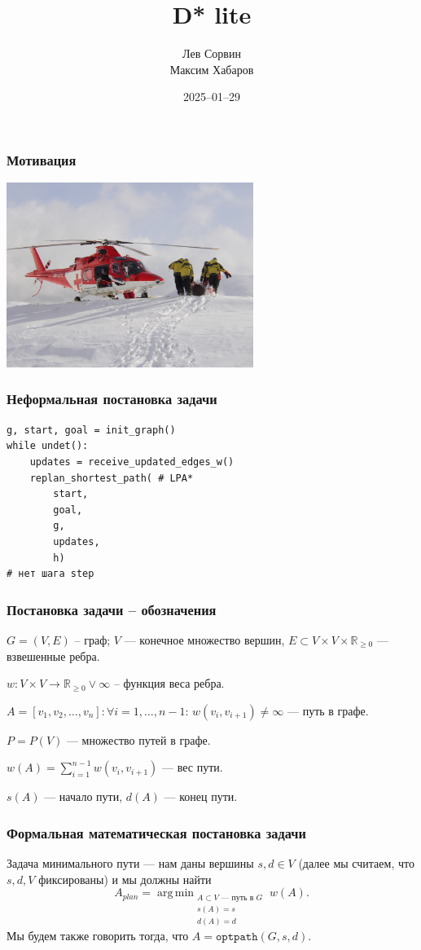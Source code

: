 \documentclass{beamer}
\title{D* lite}
\author{Лев Сорвин \\ Максим Хабаров}
\date{2025--01--29}
\newcommand{\realpositive}{\mathbb{R}_{\geqslant 0}}
\DeclareMathOperator*{\argmin}{arg\,min}
\begin{document}
    \frame{\titlepage}
    \begin{frame}[fragile]
        \frametitle{Мотивация}
        \begin{center}
            \includegraphics[height=6cm]{../figures/medical-evacuation}
        \end{center}
    \end{frame}

    \begin{frame}[fragile]
        \frametitle{Неформальная постановка задачи}
        \begin{verbatim}
g, start, goal = init_graph()
while undet():
    updates = receive_updated_edges_w()
    replan_shortest_path( # LPA*
        start,
        goal,
        g,
        updates,
        h)
# нет шага step
        \end{verbatim}
    \end{frame}

    \begin{frame}[fragile]
        \frametitle{Постановка задачи -- обозначения}
        $G = (V, E)$ -- граф; $V$ --- конечное множество вершин, $E \subset V \times V \times \realpositive$ --- взвешенные ребра.

        $w: V \times V \rightarrow {\realpositive \lor \infty}$ -- функция веса ребра.

        $A = [v_1, v_2, \dots, v_n]: \forall i = 1, \dots, n-1$: $w(v_i, v_{i+1}) \neq \infty$  --- путь в графе.

        $P = P(V)$ --- множество путей в графе.

        $w(A) = \sum_{i = 1}^{n-1} w(v_i, v_{i+1})$ --- вес пути.

        $s(A)$ --- начало пути, $d(A)$ --- конец пути.

    \end{frame}

    \begin{frame}[fragile]
        \frametitle{Формальная математическая постановка задачи}

        Задача минимального пути --- нам даны вершины $s, d \in V$  (далее мы считаем, что $s, d, V$ фиксированы) и мы должны найти
        $$A_{plan}= \argmin_{\substack{A \subset V \text{ --- путь в } G \\ s(A) = s \\ d(A) = d}} w(A).$$
        Мы будем также говорить тогда, что $A = \mathtt{optpath}(G, s, d)$.

    \end{frame}
\end{document}
